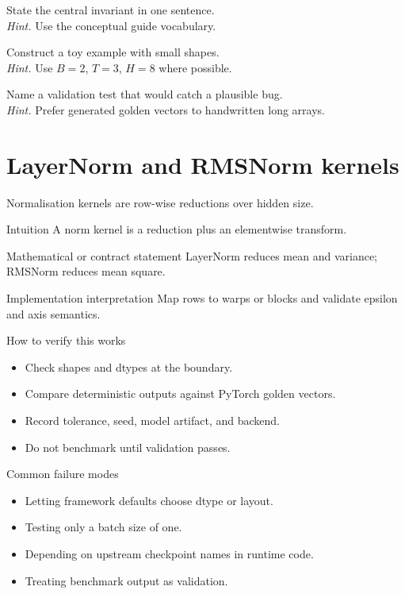 \begin{chapterexercises}
\item State the central invariant in one sentence.\\
\textit{Hint.} Use the conceptual guide vocabulary.
\item Construct a toy example with small shapes.\\
\textit{Hint.} Use $B=2$, $T=3$, $H=8$ where possible.
\item Name a validation test that would catch a plausible bug.\\
\textit{Hint.} Prefer generated golden vectors to handwritten long arrays.
\end{chapterexercises}

\chapter{LayerNorm and RMSNorm kernels}
\label{ch:norm-kernels}
Normalisation kernels are row-wise reductions over hidden size.



\begin{intuitionbox}{Intuition}
A norm kernel is a reduction plus an elementwise transform.
\end{intuitionbox}

\begin{definitionbox}{Mathematical or contract statement}
LayerNorm reduces mean and variance; RMSNorm reduces mean square.
\end{definitionbox}

\begin{implementationbox}{Implementation interpretation}
Map rows to warps or blocks and validate epsilon and axis semantics.
\end{implementationbox}

\begin{verificationbox}{How to verify this works}
\begin{itemize}
\item Check shapes and dtypes at the boundary.
\item Compare deterministic outputs against PyTorch golden vectors.
\item Record tolerance, seed, model artifact, and backend.
\item Do not benchmark until validation passes.
\end{itemize}
\end{verificationbox}

\begin{warningbox}{Common failure modes}
\begin{itemize}
\item Letting framework defaults choose dtype or layout.
\item Testing only a batch size of one.
\item Depending on upstream checkpoint names in runtime code.
\item Treating benchmark output as validation.
\end{itemize}
\end{warningbox}


